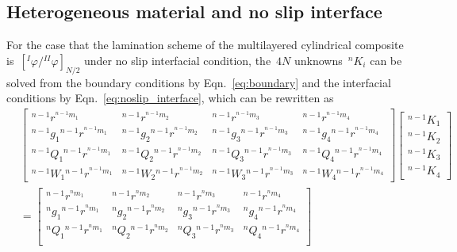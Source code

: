 \documentclass[preprint,10pt,times]{elsarticle}
\numberwithin{equation}{section}
\renewcommand{\>}{$\Rightarrow$}
\begin{document}
\subsection{Heterogeneous material and no slip interface}
\label{sec:2mat_no_slip}
For the case that the lamination scheme of the multilayered cylindrical composite is~$[{}^{I}\!\varphi/{}^{II}\!\varphi]_{N/2}$ under no slip interfacial condition, the~$4N$ unknowns~${}^{n}\!{K_{i}}$ can be solved from the boundary conditions by Eqn.~\eqref{eq:boundary} and the interfacial conditions by Eqn.~\eqref{eq:noslip_interface}, which can be rewritten as
\begin{equation}
\begin{aligned}
& \begin{bmatrix}
	{}^{n-1}\!{r}^{{}^{n-1}\!{m_{1}}} & {}^{n-1}\!{r}^{{}^{n-1}\!{m_{2}}} & {}^{n-1}\!{r}^{{}^{n-1}\!{m_{3}}} & {}^{n-1}\!{r}^{{}^{n-1}\!{m_{4}}} \\
	{}^{n-1}\!{g_{1}} {}^{n-1}\!{r}^{{}^{n-1}\!{m_{1}}} & {}^{n-1}\!{g_{2}} {}^{n-1}\!{r}^{{}^{n-1}\!{m_{2}}} & {}^{n-1}\!{g_{3}} {}^{n-1}\!{r}^{{}^{n-1}\!{m_{3}}} & {}^{n-1}\!{g_{4}} {}^{n-1}\!{r}^{{}^{n-1}\!{m_{4}}} \\
	{}^{n-1}\!{Q_{1}} {}^{n-1}\!{r}^{{}^{n-1}\!{m_{1}}} & {}^{n-1}\!{Q_{2}} {}^{n-1}\!{r}^{{}^{n-1}\!{m_{2}}} & {}^{n-1}\!{Q_{3}} {}^{n-1}\!{r}^{{}^{n-1}\!{m_{3}}} & {}^{n-1}\!{Q_{4}} {}^{n-1}\!{r}^{{}^{n-1}\!{m_{4}}} \\
	{}^{n-1}\!{W_{1}} {}^{n-1}\!{r}^{{}^{n-1}\!{m_{1}}} & {}^{n-1}\!{W_{2}} {}^{n-1}\!{r}^{{}^{n-1}\!{m_{2}}} & {}^{n-1}\!{W_{3}} {}^{n-1}\!{r}^{{}^{n-1}\!{m_{3}}} & {}^{n-1}\!{W_{4}} {}^{n-1}\!{r}^{{}^{n-1}\!{m_{4}}}
\end{bmatrix}
\begin{bmatrix}
	{}^{n-1}\!{K_{1}} \\ {}^{n-1}\!{K_{2}} \\ {}^{n-1}\!{K_{3}} \\ {}^{n-1}\!{K_{4}}
\end{bmatrix}\\
& =
  \begin{bmatrix}
	{}^{n-1}\!{r}^{{}^{n}\!{m_{1}}} & {}^{n-1}\!{r}^{{}^{n}\!{m_{2}}} & {}^{n-1}\!{r}^{{}^{n}\!{m_{3}}} & {}^{n-1}\!{r}^{{}^{n}\!{m_{4}}} \\
	{}^{n}\!{g_{1}} {}^{n-1}\!{r}^{{}^{n}\!{m_{1}}} & {}^{n}\!{g_{2}} {}^{n-1}\!{r}^{{}^{n}\!{m_{2}}} & {}^{n}\!{g_{3}} {}^{n-1}\!{r}^{{}^{n}\!{m_{3}}} & {}^{n}\!{g_{4}} {}^{n-1}\!{r}^{{}^{n}\!{m_{4}}} \\
	{}^{n}\!{Q_{1}} {}^{n-1}\!{r}^{{}^{n}\!{m_{1}}} & {}^{n}\!{Q_{2}} {}^{n-1}\!{r}^{{}^{n}\!{m_{2}}} & {}^{n}\!{Q_{3}} {}^{n-1}\!{r}^{{}^{n}\!{m_{3}}} & {}^{n}\!{Q_{4}} {}^{n-1}\!{r}^{{}^{n}\!{m_{4}}} \\

\end{bmatrix}
\end{aligned}
\end{equation}
\end{document}
